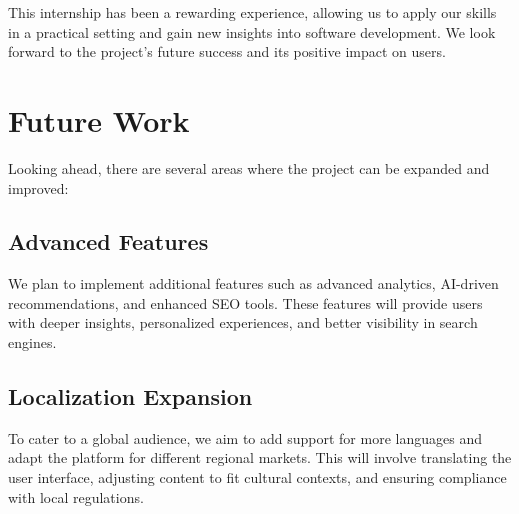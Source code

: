 This internship has been a rewarding experience, allowing us to apply our skills in a practical setting and gain new insights into software development. We look forward to the project's future success and its positive impact on users.

\section*{Future Work}
Looking ahead, there are several areas where the project can be expanded and improved:

\subsection*{Advanced Features}
We plan to implement additional features such as advanced analytics, AI-driven recommendations, and enhanced SEO tools. These features will provide users with deeper insights, personalized experiences, and better visibility in search engines.

\subsection*{Localization Expansion}
To cater to a global audience, we aim to add support for more languages and adapt the platform for different regional markets. This will involve translating the user interface, adjusting content to fit cultural contexts, and ensuring compliance with local regulations.